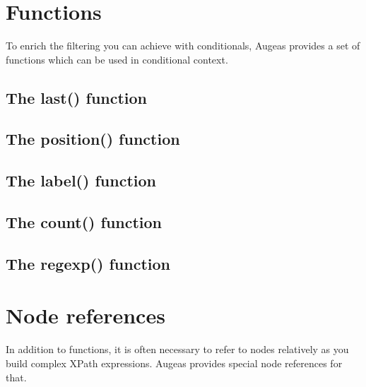 \section{Functions}

\label{sec:xpath_functions}


To enrich the filtering you can achieve with conditionals, Augeas provides a set of functions which can be used in conditional context.

\subsection{The last() function}


\subsection{The position() function}


\subsection{The label() function}


\subsection{The count() function}


\subsection{The regexp() function}



\section{Node references}

In addition to functions, it is often necessary to refer to nodes relatively as you build complex XPath expressions. Augeas provides special node references for that.

